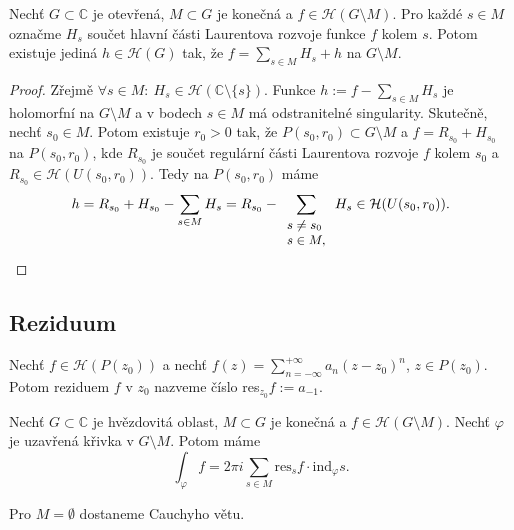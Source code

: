 \begin{theorem}
Nechť $G \subset \mathbb{C}$ je otevřená, $M \subset G$ je konečná a $f \in \mathcal{H}(G \setminus M)$. Pro každé $s \in M$ označme $H_s$ součet hlavní části Laurentova rozvoje funkce $f$ kolem $s$. Potom existuje jediná $h \in \mathcal{H}(G)$ tak, že $f=\sum\limits_{s\in M} H_s+h$ na $G \setminus M$.
\end{theorem}
\begin{proof}
Zřejmě $\forall s \in M:\ H_s \in \mathcal{H}(\mathbb{C} \setminus \{s \})$. Funkce $h:=f-\sum\limits_{s\in M} H_s$ je holomorfní na $G \setminus M$ a v bodech $s \in M$ má odstranitelné singularity. Skutečně, nechť $s_0 \in M$. Potom existuje $r_0>0$ tak, že $P(s_0,r_0) \subset G \setminus M$ a $f=R_{s_0}+H_{s_0}$ na $P(s_0,r_0)$, kde $R_{s_0}$ je součet regulární části Laurentova rozvoje $f$ kolem $s_0$ a $R_{s_0}\in \mathcal{H}(U(s_0,r_0))$. Tedy na $P(s_0,r_0)$ máme
$$h=R_{s_0}+H_{s_0}-\sum\limits_{s\in M} H_s=R_{s_0}-\sum\limits_{
\small{\begin{array}l
s \neq s_0\\
s\in M,
\end{array}}}
H_s \in \mathcal{H}(U(s_0,r_0)).$$
\end{proof}

\subsection{Reziduum}
\begin{definition}
Nechť $f \in \mathcal{H}(P(z_0))$ a nechť $f(z)=\sum\limits_{n=-\infty}^{+\infty}a_n(z-z_0)^n$, $z\in P(z_0)$. Potom reziduem $f$ v $z_0$ nazveme číslo res$_{z_0}f:=a_{-1}$.
\end{definition}

\begin{theorem}
Nechť $G \subset \mathbb{C}$ je hvězdovitá oblast, $M \subset G$ je konečná a $f \in \mathcal{H}(G \setminus M)$. Nechť $\varphi$ je uzavřená křivka v $G \setminus M$. Potom máme 
\begin{equation}
    \int_\varphi f=2\pi i \sum\limits_{s\in M}\text{res}_sf \cdot \text{ind}_\varphi s.
    \tag{RV}
    \label{eqn:7.31.RV}
\end{equation}
\end{theorem}

\begin{note*}
Pro $M=\emptyset$ dostaneme Cauchyho větu.
\end{note*}

